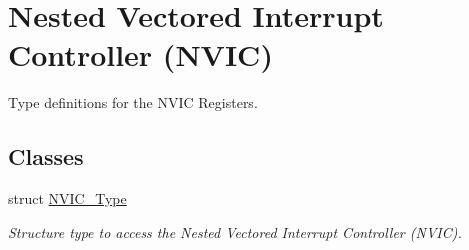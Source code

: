 \hypertarget{group___c_m_s_i_s___n_v_i_c}{\section{Nested Vectored Interrupt Controller (N\-V\-I\-C)}
\label{group___c_m_s_i_s___n_v_i_c}
}


Type definitions for the N\-V\-I\-C Registers.  


\subsection*{Classes}
\begin{DoxyCompactItemize}
\item 
struct \hyperlink{struct_n_v_i_c___type}{N\-V\-I\-C\-\_\-\-Type}
\begin{DoxyCompactList}\small\item\em Structure type to access the Nested Vectored Interrupt Controller (N\-V\-I\-C). \end{DoxyCompactList}\end{DoxyCompactItemize}
